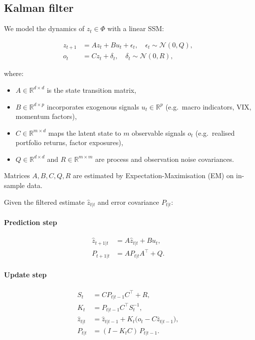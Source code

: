 \documentclass[preprint,12pt]{elsarticle}
\theoremstyle{plain}
\theoremstyle{definition}
\newcommand{\R}{\mathbb{R}}
\begin{document}
\subsection{Kalman filter}
\label{subsec:ssm}

We model the dynamics of $z_t \in \Phi$ with a linear SSM:

\begin{align}
	z_{t+1} &= A z_t + B u_t + \epsilon_t,
	\quad \epsilon_t \sim \mathcal{N}(0, Q),
	\label{eq:state_eq}\\
	o_t &= C z_t + \delta_t,
	\quad \delta_t \sim \mathcal{N}(0, R),
	\label{eq:obs_eq}
\end{align}

where:
\begin{itemize}
	\item $A \in \R^{d \times d}$ is the state transition matrix,
	\item $B \in \R^{d \times p}$ incorporates exogenous signals $u_t \in \R^p$
	(e.g.\ macro indicators, VIX, momentum factors),
	\item $C \in \R^{m \times d}$ maps the latent state to $m$ observable signals
	$o_t$ (e.g.\ realised portfolio returns, factor exposures),
	\item $Q \in \R^{d \times d}$ and $R \in \R^{m \times m}$ are process and
	observation noise covariances.
\end{itemize}

Matrices $A, B, C, Q, R$ are estimated by Expectation-Maximisation (EM) on
in-sample data.

Given the filtered estimate $\hat{z}_{t|t}$ and error covariance $P_{t|t}$:

\paragraph{Prediction step}
\begin{align}
	\hat{z}_{t+1|t} &= A\hat{z}_{t|t} + Bu_t,
	\label{eq:kf_pred_state}\\
	P_{t+1|t} &= A P_{t|t} A^\top + Q.
	\label{eq:kf_pred_cov}
\end{align}

\paragraph{Update step}
\begin{align}
	S_t &= C P_{t|t-1} C^\top + R,
	\label{eq:innovation_cov}\\
	K_t &= P_{t|t-1} C^\top S_t^{-1},
	\label{eq:kalman_gain}\\
	\hat{z}_{t|t} &= \hat{z}_{t|t-1} + K_t\bigl(o_t - C\hat{z}_{t|t-1}\bigr),
	\label{eq:kf_update_state}\\
	P_{t|t} &= (I - K_t C)\,P_{t|t-1}.
	\label{eq:kf_update_cov}
\end{align}
\end{document}
